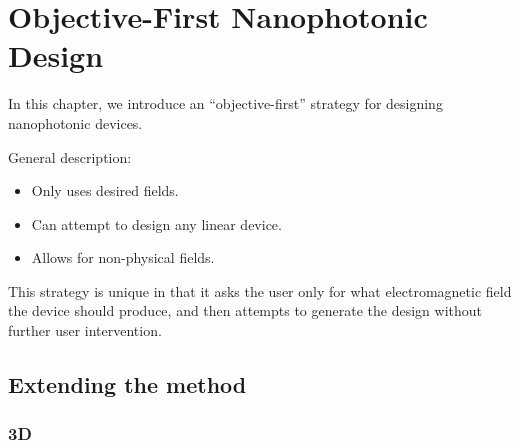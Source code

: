 \newcommand{\BE}{\begin{equation}}
\newcommand{\EE}{\end{equation}}
\newcommand{\BA}{\begin{eqnarray}}
\newcommand{\EA}{\end{eqnarray}}
\newcommand{\curl}{\nabla\times}
\newcommand{\minimize}[1]{\JLUminimize_{#1}\;&}
\newcommand{\subto}{\text{subject to}\;&}

\newcommand{\myfig}[2]{\begin{figure}[!h]\texttt{[image: fig/\#1.jpg]}\caption{#2}\label{fig:#1}\end{figure}}

\newcommand{\BI}{\begin{itemize}\item}
\renewcommand{\I}{\item}
\newcommand{\EI}{\end{itemize}}

\newcommand{\ER}[1]{\eqref{eq:#1}}
\newcommand{\SR}[1]{Section~\ref{sec:#1}}
\newcommand{\sR}[1]{section~\ref{sec:#1}}
\newcommand{\FR}[1]{Figure~\ref{fig:#1}}
\newcommand{\fR}[1]{figure~\ref{fig:#1}}
\chapter{Objective-First Nanophotonic Design}
\label{intro}


In this chapter, we introduce an ``objective-first'' strategy 
    for designing nanophotonic devices.

General description:
\BI Only uses desired fields.
\I  Can attempt to design any linear device.
\I  Allows for non-physical fields. \EI

This strategy is unique in that it
    asks the user only for what electromagnetic field
    the device should produce,
    and then attempts to generate the design
    without further user intervention.



% 
% 




\section{Extending the method}
\subsection{3D}
